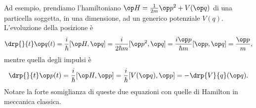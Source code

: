 Ad esempio, prendiamo l'hamiltoniano $\op H=\frac1{2m}\op p^2+V(\op q)$ di una particella soggetta, in una dimensione, ad un generico potenziale $V(q)$.
L'evoluzione della posizione è
\begin{equation}
	\drp{}{t}\op q(t)=\frac{i}{\hbar}[\op H,\op q]=\frac{i}{2\hbar m}[\op p^2,\op q]=\frac{i\op p}{\hbar m}[\op p,\op q]=\frac{\op p}{m},
\end{equation}
mentre quella degli impulsi è
\begin{equation}
	\drp{}{t}\op p(t)=\frac{i}{\hbar}[\op H,\op p]=\frac{i}{\hbar}[V(\op q),\op p]=-\drp{V}{q}(\op q).
\end{equation}
Notare la forte somiglianza di queste due equazioni con quelle di Hamilton in meccanica classica.
